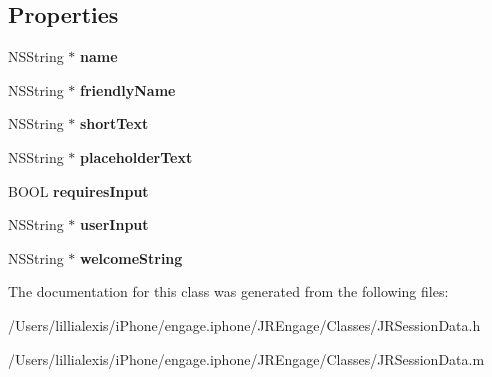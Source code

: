 \subsection*{Properties}
\begin{DoxyCompactItemize}
\item 
\hypertarget{interface_j_r_provider_ac3a673d56e1fbc3d2932bd8e66308b93}{
NSString $\ast$ {\bfseries name}}
\label{interface_j_r_provider_ac3a673d56e1fbc3d2932bd8e66308b93}

\item 
\hypertarget{interface_j_r_provider_a5c462fe76414af50db33787a302db646}{
NSString $\ast$ {\bfseries friendlyName}}
\label{interface_j_r_provider_a5c462fe76414af50db33787a302db646}

\item 
\hypertarget{interface_j_r_provider_aecfd2825da11a6959a54a57617bde07a}{
NSString $\ast$ {\bfseries shortText}}
\label{interface_j_r_provider_aecfd2825da11a6959a54a57617bde07a}

\item 
\hypertarget{interface_j_r_provider_ad30dd52c66eab259ec2bd8f6e11c8a14}{
NSString $\ast$ {\bfseries placeholderText}}
\label{interface_j_r_provider_ad30dd52c66eab259ec2bd8f6e11c8a14}

\item 
\hypertarget{interface_j_r_provider_af08bdd8175aaac0d505d2e0e46a342fc}{
BOOL {\bfseries requiresInput}}
\label{interface_j_r_provider_af08bdd8175aaac0d505d2e0e46a342fc}

\item 
\hypertarget{interface_j_r_provider_ae9ed288d2f89bb1d14286b7685857345}{
NSString $\ast$ {\bfseries userInput}}
\label{interface_j_r_provider_ae9ed288d2f89bb1d14286b7685857345}

\item 
\hypertarget{interface_j_r_provider_ad3b8e1bea1a35f738e31548deddc2d93}{
NSString $\ast$ {\bfseries welcomeString}}
\label{interface_j_r_provider_ad3b8e1bea1a35f738e31548deddc2d93}

\end{DoxyCompactItemize}


The documentation for this class was generated from the following files:\begin{DoxyCompactItemize}
\item 
/Users/lillialexis/iPhone/engage.iphone/JREngage/Classes/JRSessionData.h\item 
/Users/lillialexis/iPhone/engage.iphone/JREngage/Classes/JRSessionData.m\end{DoxyCompactItemize}
